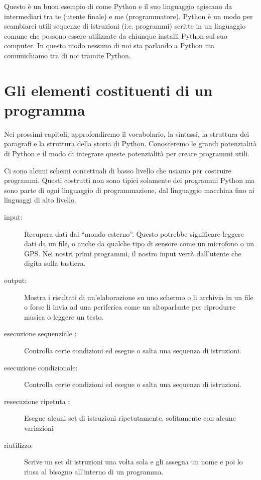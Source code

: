 Questo \`{e} un buon esempio di come Python e il suo linguaggio agiscano da intermediari tra te (utente finale) e me (programmatore). Python \`{e} un modo per scambiarci utili sequenze di istruzioni (i.e. programmi) scritte in un linguaggio comune che possono essere utilizzate da chiunque installi Python sul suo computer. In questo modo nessuno di noi sta parlando a Python ma comunichiamo tra di noi tramite Python.

\section{Gli elementi costituenti di un programma}

Nei prossimi capitoli, approfondiremo il vocabolario, la sintassi, la struttura dei paragrafi e la struttura della storia di Python. Conosceremo le grandi potenzialit\`{a} di Python e il modo di integrare queste potenzialit\`{a} per creare programmi utili.


Ci sono alcuni schemi concettuali di basso livello che usiamo per costruire programmi. Questi costrutti non sono tipici solamente dei programmi Python ma sono parte di ogni linguaggio di programmazione, dal linguaggio macchina fino ai linguaggi di alto livello.

\begin{description}

\item[input:] Recupera dati dal {``}mondo esterno''. Questo potrebbe significare leggere dati da un file, o anche da qualche tipo di sensore come un microfono o un GPS. Nei nostri primi programmi, il nostro input verr\`{a} dall'utente che digita sulla tastiera.


\item[output:] Mostra i risultati di un'elaborazione su uno schermo o li archivia in un file o forse li invia ad una periferica come un altoparlante per riprodurre musica o leggere un testo.


\item[esecuzione sequenziale :] Controlla certe condizioni ed esegue o salta una sequenza di istruzioni.


\item[esecuzione condizionale:] Controlla certe condizioni ed esegue o salta una sequenza di istruzioni.


\item[resecuzione ripetuta :] Esegue alcuni set di istruzioni ripetutamente, solitamente con alcune variazioni

\item[riutilizzo:] Scrive un set di istruzioni una volta sola e gli assegna un nome e poi lo riusa al bisogno all'interno di un programma.

\end{description}

